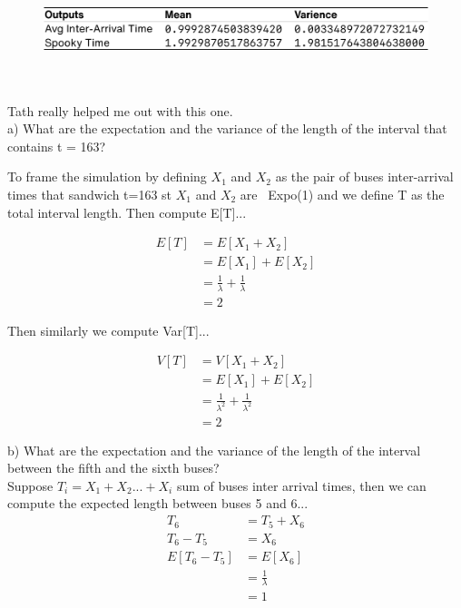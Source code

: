 \documentclass[twocolumn]{article}
\begin{document}

\begin{figure}[H]
	\centering
	\includegraphics[width=1\linewidth]{../drawings/p6}
	\caption{}
\end{figure}

\noindent
{} \\\\
Tath really helped me out with this one.\\

\noindent
\mm a) What are the expectation and the variance of the length of the interval that contains t = 163?\\ \normalfont

To frame the simulation by defining $X_1$ and $X_2$ as the pair of buses inter-arrival times that sandwich t=163 st  $X_1$ and $X_2$ are ~Expo(1) and we define T as the total interval length. Then compute E[T]...

\begin{align*}
	E[T] &= E[X_1 + X_2]\\
		 &= E[X_1] + E[X_2]\\
	     &= \frac{1}{\lambda} + \frac{1}{\lambda}\\
	     &= 2
\end{align*}

Then similarly we compute Var[T]...


\begin{align*}
	V[T] &= V[X_1 + X_2]\\
	&= E[X_1] + E[X_2]\\
	&= \frac{1}{\lambda^2} + \frac{1}{\lambda^2}\\
	&= 2
\end{align*}


\noindent
\mm b)  What are the expectation and the variance of the length of the interval between the fifth and the sixth buses? \normalfont\\

Suppose $T_i = X_1 + X_2 ... + X_i$ sum of buses inter arrival times, then we can compute the expected length between buses 5 and 6...
\begin{align*}
	T_6 &= T_5 + X_6\\
	T_6 - T_5 &= X_6\\	
	E[T_6 - T_5] &= E[X_6]\\
	&= \frac{1}{\lambda}\\
	&= 1	
\end{align*}
\end{document}
